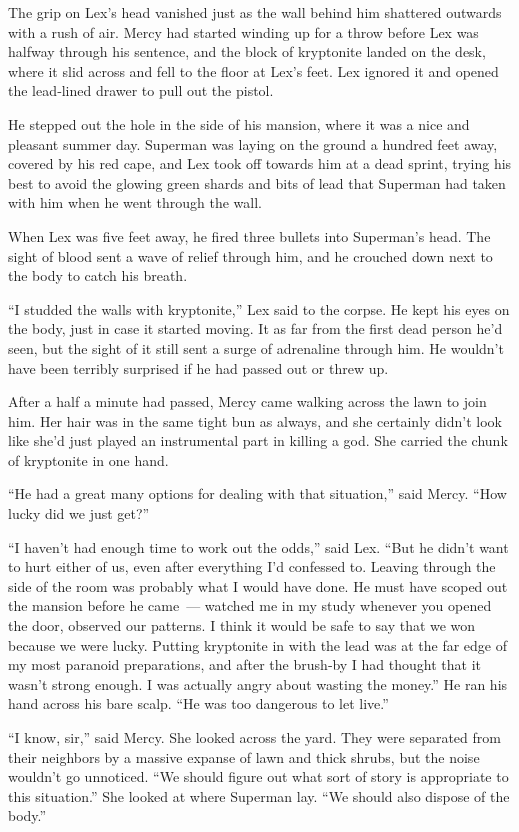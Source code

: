 The grip on Lex's head vanished just as the wall behind him shattered
outwards with a rush of air. Mercy had started winding up for a throw
before Lex was halfway through his sentence, and the block of kryptonite
landed on the desk, where it slid across and fell to the floor at Lex's
feet. Lex ignored it and opened the lead‐lined drawer to pull out the
pistol.

He stepped out the hole in the side of his mansion, where it was a nice
and pleasant summer day. Superman was laying on the ground a hundred
feet away, covered by his red cape, and Lex took off towards him at a
dead sprint, trying his best to avoid the glowing green shards and bits
of lead that Superman had taken with him when he went through the wall.

When Lex was five feet away, he fired three bullets into Superman's
head. The sight of blood sent a wave of relief through him, and he
crouched down next to the body to catch his breath.

``I studded the walls with kryptonite,'' Lex said to the corpse. He kept
his eyes on the body, just in case it started moving. It as far from the
first dead person he'd seen, but the sight of it still sent a surge of
adrenaline through him. He wouldn't have been terribly surprised if he
had passed out or threw up.

After a half a minute had passed, Mercy came walking across the lawn to
join him. Her hair was in the same tight bun as always, and she
certainly didn't look like she'd just played an instrumental part in
killing a god. She carried the chunk of kryptonite in one hand.

``He had a great many options for dealing with that situation,'' said
Mercy. ``How lucky did we just get?''

``I haven't had enough time to work out the odds,'' said Lex. ``But he
didn't want to hurt either of us, even after everything I'd confessed
to. Leaving through the side of the room was probably what I would have
done. He must have scoped out the mansion before he came~--- watched me
in my study whenever you opened the door, observed our patterns. I think
it would be safe to say that we won because we were lucky. Putting
kryptonite in with the lead was at the far edge of my most paranoid
preparations, and after the brush‐by I had thought that it wasn't strong
enough. I was actually angry about wasting the money.'' He ran his hand
across his bare scalp. ``He was too dangerous to let live.''

``I know, sir,'' said Mercy. She looked across the yard. They were
separated from their neighbors by a massive expanse of lawn and thick
shrubs, but the noise wouldn't go unnoticed. ``We should figure out what
sort of story is appropriate to this situation.'' She looked at where
Superman lay. ``We should also dispose of the body.''

